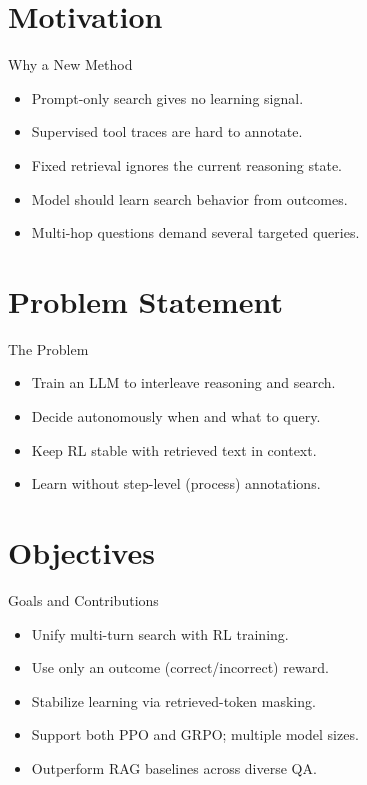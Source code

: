 \documentclass{beamer}
\begin{document}
\section{Motivation}
\begin{frame}{Why a New Method}
\begin{itemize}
\item Prompt-only search gives no learning signal.
\item Supervised tool traces are hard to annotate.
\item Fixed retrieval ignores the current reasoning state.
\item Model should learn search behavior from outcomes.
\item Multi-hop questions demand several targeted queries.
\end{itemize}
\end{frame}

\section{Problem Statement}
\begin{frame}{The Problem}
\begin{itemize}
\item Train an LLM to interleave reasoning and search.
\item Decide autonomously when and what to query.
\item Keep RL stable with retrieved text in context.
\item Learn without step-level (process) annotations.
\end{itemize}
\end{frame}

\section{Objectives}
\begin{frame}{Goals and Contributions}
\begin{itemize}
\item Unify multi-turn search with RL training.
\item Use only an outcome (correct/incorrect) reward.
\item Stabilize learning via retrieved-token masking.
\item Support both PPO and GRPO; multiple model sizes.
\item Outperform RAG baselines across diverse QA.
\end{itemize}
\end{frame}
\end{document}
